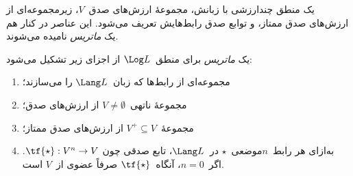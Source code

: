 \documentclass[../../../include/open-logic-section]{subfiles}
\begin{document}


یک منطق چندارزشی با زبانش، مجموعهٔ ارزش‌های صدق~$V$، زیرمجموعه‌ای از
ارزش‌های صدق ممتاز، و توابع صدق رابط‌هایش تعریف می‌شود. این عناصر در
کنار هم یک \emph{ماتریس} نامیده می‌شوند.

\begin{defn}[ماتریس]
یک \emph{ماتریس} برای منطق~$\Log L$ از اجزای زیر تشکیل می‌شود:
\begin{enumerate}
\item مجموعه‌ای از رابط‌ها که زبان~$\Lang L$ را می‌سازند؛
\item مجموعهٔ ناتهی~$V \neq \emptyset$ از ارزش‌های صدق؛
\item مجموعهٔ~$V^+ \subseteq V$ از ارزش‌های صدق ممتاز؛
\item به‌ازای هر رابط~$n$موضعی~$\star$ در~$\Lang L$، تابع صدقی چون
$\tf{\star} : V^n \to V$. اگر~$n = 0$، آنگاه~$\tf{\star}$ صرفاً عضوی
از~$V$ است.
\end{enumerate}
\end{defn}
\end{document}
